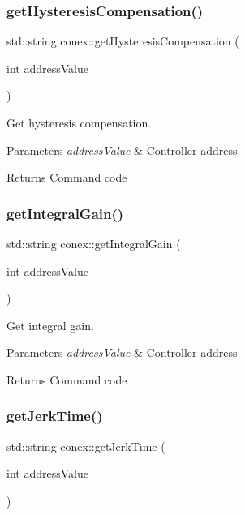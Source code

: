 \subsubsection{\texorpdfstring{get\+Hysteresis\+Compensation()}{getHysteresisCompensation()}}
{\footnotesize\ttfamily std\+::string conex\+::get\+Hysteresis\+Compensation (\begin{DoxyParamCaption}\item[{int}]{address\+Value }\end{DoxyParamCaption})}



Get hysteresis compensation. 


\begin{DoxyParams}{Parameters}
{\em address\+Value} & Controller address \\
\hline
\end{DoxyParams}
\begin{DoxyReturn}{Returns}
Command code 
\end{DoxyReturn}
\mbox{\label{namespaceconex_ad08578dd23c3b65f2d73405ca35774ad}} 
\subsubsection{\texorpdfstring{get\+Integral\+Gain()}{getIntegralGain()}}
{\footnotesize\ttfamily std\+::string conex\+::get\+Integral\+Gain (\begin{DoxyParamCaption}\item[{int}]{address\+Value }\end{DoxyParamCaption})}



Get integral gain. 


\begin{DoxyParams}{Parameters}
{\em address\+Value} & Controller address \\
\hline
\end{DoxyParams}
\begin{DoxyReturn}{Returns}
Command code 
\end{DoxyReturn}
\mbox{\label{namespaceconex_acef19de1c3d630503736cf1bf20d4dbc}} 
\subsubsection{\texorpdfstring{get\+Jerk\+Time()}{getJerkTime()}}
{\footnotesize\ttfamily std\+::string conex\+::get\+Jerk\+Time (\begin{DoxyParamCaption}\item[{int}]{address\+Value }\end{DoxyParamCaption})}




